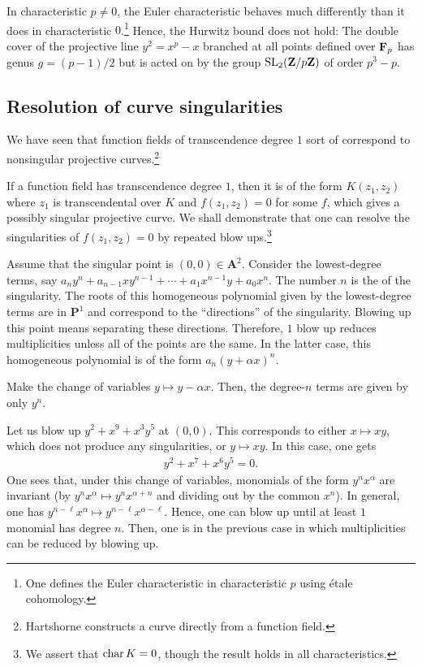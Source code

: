 \documentclass [11 pt, oneside] {article}
\begin{document}
\begin{remark}
	In characteristic $p\ne 0$, the Euler characteristic behaves much differently than it does in characteristic $0$.\footnote{One defines the Euler characteristic in characteristic $p$ using \'etale cohomology.} Hence, the Hurwitz bound does not hold: The double cover of the projective line $y^2=x^p-x$ branched at all points defined over $\mathbf F_p$ has genus $g = (p-1)/2$ but is acted on by the group $\operatorname{SL}_{2}(\mathbf Z/p\mathbf Z)$ of order $p^3-p$.
\end{remark}

\subsection{Resolution of curve singularities}
We have seen that function fields of transcendence degree $1$ sort of correspond to nonsingular projective curves.\footnote{Hartshorne constructs a curve directly from a function field.} 

If a function field has transcendence degree $1$, then it is of the form $K(z_1,z_2)$ where $z_1$ is transcendental over $K$ and $f(z_1,z_2)=0$ for some $f$, which gives a possibly singular projective curve. We shall demonstrate that one can resolve the singularities of $f(z_1,z_2)=0$ by repeated blow ups.\footnote{We assert that $\operatorname{char} K =0$, though the result holds in all characteristics.}

Assume that the singular point is $(0,0)\in  \mathbf{A}^2$. Consider the lowest-degree terms, say $a_ny^n + a_{n-1}xy^{n-1} + \cdots + a_1 x^{n-1}y + a_0 x^n$. The number $n$ is the  of the singularity. The roots of this homogeneous polynomial given by the lowest-degree terms are in $\mathbf{P}^1$ and correspond to the ``directions'' of the singularity. Blowing up this point means separating these directions. Therefore, $1$ blow up reduces multiplicities unless all of the points are the same. In the latter case, this homogeneous polynomial is of the form $a_n(y+\alpha x)^n$.

Make the change of variables $y\longmapsto y-\alpha x$. Then, the degree-$n$ terms are given by only $y^n$.

\begin{example}[ ]\label{}\text{}
Let us blow up $y^2+x^9 + x^3y^5$ at $(0,0)$. This corresponds to either $x\longmapsto xy$, which does not produce any singularities, or $y\longmapsto xy$. In this case, one gets
\begin{align*}
	y^2 + x^7 + x^6y^5=0.
\end{align*}
One sees that, under this change of variables, monomials of the form $y^nx^\alpha$ are invariant (by $y^nx^\alpha\longmapsto y^nx^{\alpha+n}$ and dividing out by the common $x^n$). In general, one has $y^{n-\ell}x^\alpha \longmapsto y^{n-\ell}x^{\alpha-\ell}$. Hence, one can blow up until at least $1$ monomial has degree $n$. Then, one is in the previous case in which multiplicities can be reduced by blowing up.
\end{example}
\end{document}
